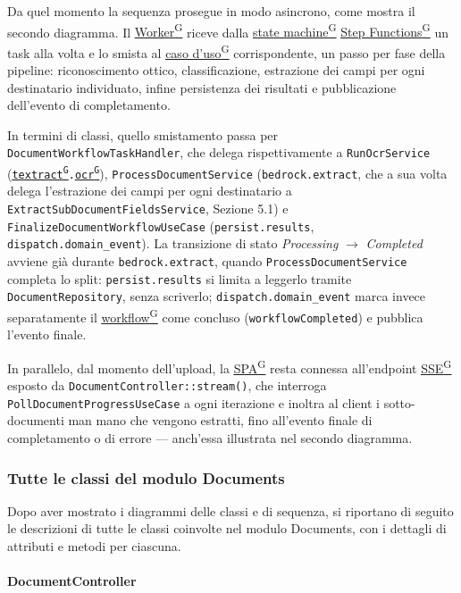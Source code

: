 \documentclass[a4paper,12pt]{article}
\providecommand{\glslink}[2]{\href{https://alittlebyte-19.github.io/Documentazione/glossario.html\#gls-#1}{\underline{#2}\textsuperscript{\scriptsize G}}}
\begin{document}
\begin{sloppypar}
Da quel momento la sequenza prosegue in modo asincrono, come mostra il secondo diagramma. Il \glslink{worker}{Worker} riceve dalla \glslink{state-machine}{state machine} \glslink{step-functions}{Step Functions} un task alla volta e lo smista al \glslink{caso-d-uso-uc}{caso d'uso} corrispondente, un passo per fase della pipeline: riconoscimento ottico, classificazione, estrazione dei campi per ogni destinatario individuato, infine persistenza dei risultati e pubblicazione dell'evento di completamento.

In termini di classi, quello smistamento passa per \texttt{DocumentWorkflowTaskHandler}, che delega rispettivamente a \texttt{RunOcrService} (\texttt{\glslink{textract}{textract}.\glslink{ocr-riconoscimento-ottico-dei-caratteri}{ocr}}), \texttt{ProcessDocumentService} (\texttt{bedrock.extract}, che a sua volta delega l'estrazione dei campi per ogni destinatario a \texttt{ExtractSubDocumentFieldsService}, Sezione 5.1) e \texttt{FinalizeDocumentWorkflowUseCase} (\texttt{persist.results}, \texttt{dispatch.domain\_event}). La transizione di stato \textit{Processing} $\rightarrow$ \textit{Completed} avviene già durante \texttt{bedrock.extract}, quando \texttt{ProcessDocumentService} completa lo split: \texttt{persist.results} si limita a leggerlo tramite \texttt{DocumentRepository}, senza scriverlo; \texttt{dispatch.domain\_event} marca invece separatamente il \glslink{workflow}{workflow} come concluso (\texttt{workflowCompleted}) e pubblica l'evento finale.

In parallelo, dal momento dell'upload, la \glslink{spa-single-page-application}{SPA} resta connessa all'endpoint \glslink{sse-server-sent-events}{SSE} esposto da \texttt{DocumentController::stream()}, che interroga \texttt{PollDocumentProgressUseCase} a ogni iterazione e inoltra al client i sotto-documenti man mano che vengono estratti, fino all'evento finale di completamento o di errore --- anch'essa illustrata nel secondo diagramma.

\subsubsection{Tutte le classi del modulo Documents}

Dopo aver mostrato i diagrammi delle classi e di sequenza, si riportano di seguito le descrizioni di tutte le classi coinvolte nel modulo Documents, con i dettagli di attributi e metodi per ciascuna.

\paragraph{DocumentController}


\end{sloppypar}
\end{document}
